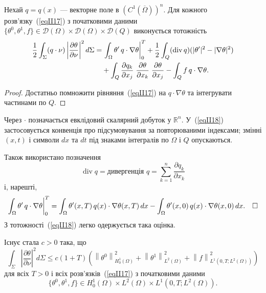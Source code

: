 \begin{lemma}
\label{lemma:II.2.1}
Нехай $q = q(x)$ — векторне поле в $(C^1(\overline{\Omega}))^n$. Для кожного розв'язку~(\ref{eqII17}) з початковими даними $\{\theta^0, \theta^1, f\} \in \mathcal{D}(\Omega) \times \mathcal{D}(\Omega) \times \mathcal{D}(Q)$ виконується тотожність
\begin{align} \label{eqII18}
\begin{split}
\frac{1}{2} \int_\Sigma (q \cdot \nu) \left| \frac{\partial \theta}{\partial \nu}  \right|^2 d\Sigma = &\, \int_\Omega \theta^\prime\, q \cdot \nabla \theta \bigg|_0^T + \frac{1}{2} \int_Q (\operatorname{div}q)(|\theta^\prime|^2 - |\nabla \theta|^2)
\\ &+  \int_Q \frac{\partial q_k}{\partial x_j} \hspace{0.1cm} \frac{\partial \theta}{\partial x_k} \hspace{0.1cm} \frac{\partial \theta}{\partial x_j} - \int_Q f\, q \cdot \nabla \theta.
\end{split}
\end{align}
\end{lemma}

\begin{proof}
\label{proof:II.lemma.2.1}
Достатньо помножити рівняння~(\ref{eqII17}) на $q \cdot \nabla \theta$ та інтегрувати частинами по $Q$.
\end{proof}

\begin{remark}
\label{remark:II.2.3}
Через $\cdot$ позначається евклідовий скалярний добуток у $\mathbb{R}^n$. У~(\ref{eqII18}) застосовується конвенція про підсумовування за повторюваними індексами; змінні $(x,t)$ і символи $dx$ та $dt$ під знаками інтегралів по $\Omega$ і $Q$ опускаються.
\end{remark}

Також використано позначення
\begin{equation*}
    \operatorname{div} q = \text{дивергенція } q = \sum_{k=1}^{n} \frac{\partial q_k}{\partial x_k}
\end{equation*}
і, нарешті,
\begin{equation*}
\int_\Omega \theta^\prime\, q \cdot \nabla \theta \bigg|_0^T = \int_\Omega \theta^\prime (x,T)\, q(x) \cdot \nabla \theta(x,T)\, dx - \int_\Omega \theta^\prime(x,0)\, q(x) \cdot \nabla \theta(x,0)\, dx. \quad \hfill \square
\end{equation*}
З тотожності~(\ref{eqII18}) легко одержується така оцінка.
\begin{theorem}
\label{theorem:II.2.1}
Існує стала $c>0$ така, що
\begin{equation}\label{eqII19}
\int_\Sigma \left|\frac{\partial \theta}{\partial \nu} \right|^2 d\Sigma \leq c(1+T) \left(\left\|\theta^0 \right\|_{H_0^1(\Omega)}^2 + \left\|\theta^1 \right\|_{L^2(\Omega)}^2 + \left\| f \right\|_{L^1(0,T; L^2(\Omega))}^2\right)
\end{equation}
для всіх $T>0$ і всіх розв'язків~(\ref{eqII17}) з початковими даними
$$
\{\theta^0, \theta^1, f\} \in H_0^1(\Omega) \times L^2(\Omega) \times L^1(0,T; L^2(\Omega)).
$$
\end{theorem}

